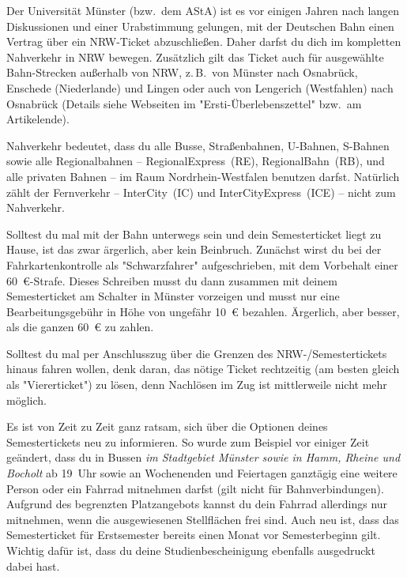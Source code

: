 \begin{multicols*}{2}
Der Universität Münster (bzw.\ dem AStA) ist es vor einigen Jahren nach langen Diskussionen und einer Urabstimmung gelungen, mit der Deutschen Bahn einen Vertrag über ein NRW-Ticket abzuschließen.
Daher darfst du dich im kompletten Nahverkehr in NRW bewegen.
Zusätzlich gilt das Ticket auch für ausgewählte Bahn-Strecken außerhalb von NRW, z.\,B.\ von Münster nach Osnabrück, Enschede (Niederlande) und Lingen oder auch von Lengerich (Westfahlen) nach Osnabrück (Details siehe Webseiten im "Ersti-Überlebenszettel" bzw.\ am Artikelende).

Nahverkehr bedeutet, dass du alle Busse, Straßenbahnen, U-Bahnen, S-Bahnen sowie alle Regionalbahnen -- RegionalExpress~(RE), RegionalBahn~(RB), und alle privaten Bahnen -- im Raum Nordrhein-Westfalen benutzen darfst.
Natürlich zählt der Fernverkehr -- InterCity~(IC) und InterCityExpress~(ICE) -- nicht zum Nahverkehr.

Solltest du mal mit der Bahn unterwegs sein und dein Semesterticket liegt zu Hause, ist das zwar ärgerlich, aber kein Beinbruch.
Zunächst wirst du bei der Fahrkartenkontrolle als "Schwarzfahrer" aufgeschrieben, mit dem Vorbehalt einer \SI{60}{\euro}-Strafe.
Dieses Schreiben musst du dann zusammen mit deinem Semesterticket am Schalter in Münster vorzeigen und musst nur eine Bearbeitungsgebühr in Höhe von ungefähr \SI{10}{\euro} bezahlen.
Ärgerlich, aber besser, als die ganzen \SI{60}{\euro} zu zahlen.

Solltest du mal per Anschlusszug über die Grenzen des NRW-/Semestertickets hinaus fahren wollen, denk daran, das nötige Ticket rechtzeitig (am besten gleich als "Viererticket") zu lösen, denn Nachlösen im Zug ist mittlerweile nicht mehr möglich.

Es ist von Zeit zu Zeit ganz ratsam, sich über die Optionen deines Semestertickets neu zu informieren.
So wurde zum Beispiel vor einiger Zeit geändert, dass du in Bussen \emph{im Stadtgebiet Münster sowie in Hamm, Rheine und Bocholt} ab 19~Uhr sowie an Wochenenden und Feiertagen ganztägig eine weitere Person oder ein Fahrrad mitnehmen darfst (gilt nicht für Bahnverbindungen).
Aufgrund des begrenzten Platzangebots kannst du dein Fahrrad allerdings nur mitnehmen, wenn die ausgewiesenen Stellflächen frei sind.
Auch neu ist, dass das Semesterticket für Erstsemester bereits einen Monat vor Semesterbeginn gilt. Wichtig dafür ist, dass du deine Studienbescheinigung ebenfalls ausgedruckt dabei hast.


\end{multicols*}
